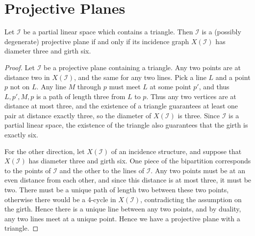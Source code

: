 	

\section*{Projective Planes}


\begin{theorem}
	Let $\mathcal{I}$ be a partial linear space which contains a triangle.  Then $\mathcal{I}$ is a (possibly degenerate) projective plane if and only if its incidence graph $X(\mathcal{I})$ has diameter three and girth six.
\end{theorem}

\begin{proof}
	Let $\mathcal{I}$ be a projective plane containing a triangle.  Any two points are at distance two in $X(\mathcal{I})$, and the same for any two lines.  Pick a line $L$ and a point $p$ not on $L$.  Any line $M$ through $p$ must meet $L$ at some point $p'$, and thus $L,p',M,p$ is a path of length three from $L$ to $p$.  Thus any two vertices are at distance at most three, and the existence of a triangle guarantees at least one pair at distance exactly three, so the diameter of $X(\mathcal{I})$ is three.  Since $\mathcal{I}$ is a partial linear space, the existence of the triangle also guarantees that the girth is exactly six.
	
	For the other direction, let $X(\mathcal{I})$ of an incidence structure, and suppose that $X(\mathcal{I})$ has diameter three and girth six.  One piece of the bipartition corresponds to the points of $\mathcal{I}$ and the other to the lines of $\mathcal{I}$.  Any two points must be at an even distance from each other, and since this distance is at most three, it must be two.  There must be a unique path of length two between these two points, otherwise there would be a 4-cycle in $X(\mathcal{I})$, contradicting the assumption on the girth.  Hence there is a unique line between any two points, and by duality, any two lines meet at a unique point.  Hence we have a projective plane with a triangle.
\end{proof}


